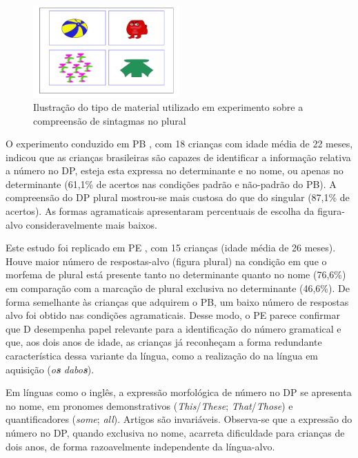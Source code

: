 \documentclass[output=paper]{LSP/langsci}
\begin{document}
\begin{figure}
\includegraphics[width=0.5\textwidth]{figures/correanp3}
\caption{Ilustração do tipo de material utilizado em experimento sobre a compreensão de sintagmas no plural}
\label{fig:correanp_3}
\end{figure}

O experimento conduzido em PB \citep{correa_etal2005}, com 18 crianças com idade média de 22 meses, indicou que as crianças brasileiras são capazes de identificar a informação relativa a número no DP, esteja esta expressa no determinante e no nome, ou apenas no determinante (61,1\% de acertos nas condições padrão e não-padrão do PB). A compreensão do DP plural mostrou-se mais custosa do que do singular (87,1\% de acertos). As formas agramaticais apresentaram percentuais de escolha da figura-alvo consideravelmente mais baixos. 

Este estudo foi replicado em PE \citep{castroferrarineto2007}, com 15 crianças (idade média de 26 meses).  Houve maior número de respostas-alvo (figura plural) na condição em que o morfema de plural está presente tanto no determinante quanto no nome (76,6\%) em comparação com a marcação de plural exclusiva no determinante (46,6\%).  De forma semelhante às crianças que adquirem o PB, um baixo número de respostas alvo foi obtido nas condições agramaticais.  Desse modo, o PE parece confirmar que D desempenha papel relevante para a identificação do número gramatical e que, aos dois anos de idade, as crianças já reconheçam a forma redundante característica dessa variante da língua, como a realização do  na língua em aquisição (\textit{o\textbf{s} dabo\textbf{s}}).

Em línguas como o inglês, a expressão morfológica de número no DP se apresenta no nome, em pronomes demonstrativos (\textit{This}/\textit{These}; \textit{That}/\textit{Those}) e quantificadores (\textit{some}; \textit{all}). Artigos são invariáveis.  Observa-se que a expressão do número no DP, quando exclusiva no nome, acarreta dificuldade para crianças de dois anos, de forma razoavelmente independente da língua-alvo. 
\end{document}
